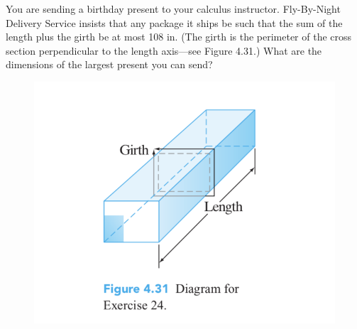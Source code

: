 \documentclass[12pt,letterpaper]{hmcpset}
\begin{document}
\begin{problem}[Colley 4.3.24]
You are sending a birthday present to your calculus instructor. Fly-By-Night Delivery Service insists that any package it ships be such that the sum of the length plus the girth be at most 108 in. (The girth is the perimeter of the cross section perpendicular to the length axis—see Figure 4.31.) What are the dimensions of the largest present you can send?
\end{problem}
  \begin{figure}[ht]
    \centering
    \includegraphics[scale=0.6]{assets/12_2.jpg}
  \end{figure}
\clearpage
\end{document}
